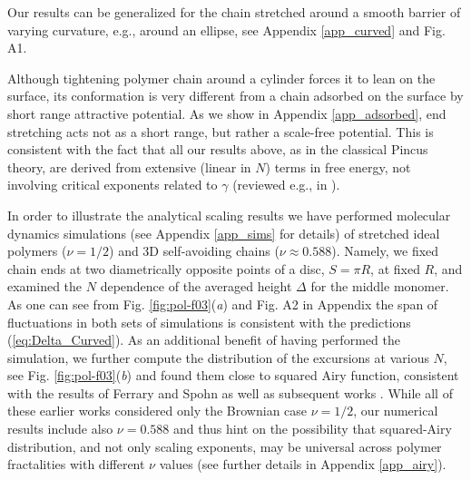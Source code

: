 \documentclass[aps,pre,floatfix,twocolumn,nofootinbib]{revtex4-2}
\newcommand{\eq}[1]{(\ref{#1})}
\begin{document}
Our results can be generalized for the chain stretched around a smooth barrier of varying curvature, e.g., around an ellipse, see Appendix \ref{app_curved} and Fig. A1.

Although tightening polymer chain around a cylinder forces it to lean on the surface, its conformation is very different from a chain adsorbed on the surface by short range attractive potential.  As we show in Appendix \ref{app_adsorbed}, end stretching acts not as a short range, but rather a scale-free potential.  This is consistent with the fact that all our results above, as in the classical Pincus theory, are derived from extensive (linear in $N$) terms in free energy, not involving critical exponents related to $\gamma$ (reviewed e.g., in \cite{Paper_about_gamma}).

In order to illustrate the analytical scaling results we have performed molecular dynamics simulations (see Appendix \ref{app_sims} for details) of stretched ideal polymers ($\nu = 1/2$) and 3D self-avoiding chains ($\nu \approx 0.588$). Namely, we fixed chain ends at two diametrically opposite points of a disc, $S=\pi R$, at fixed $R$, and examined the $N$ dependence of the averaged height $\Delta$ for the middle monomer.  As one can see from Fig. \ref{fig:pol-f03}(\textit{a}) and Fig. A2 in Appendix the span of fluctuations in both sets of simulations is consistent with the predictions \eq{eq:Delta_Curved}. As an additional benefit of having performed the simulation, we further compute the distribution of the excursions at various $N$, see Fig. \ref{fig:pol-f03}(\textit{b}) and found them close to squared Airy function, consistent with the results of Ferrary and Spohn \cite{spohn_ferrari} as well as subsequent works \cite{valov_fixman,Baruch1}.  While all of these earlier works considered only the Brownian case $\nu = 1/2$, our numerical results include also $\nu = 0.588$ and thus hint on the possibility that squared-Airy distribution, and not only scaling exponents, may be universal across polymer fractalities with different $\nu$ values (see further details in Appendix \ref{app_airy}).

\end{document}
